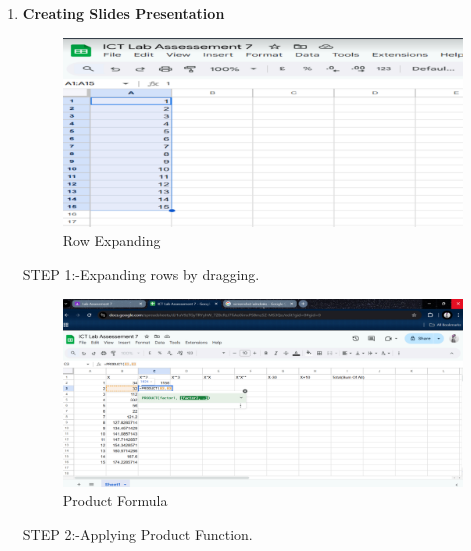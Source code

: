 \documentclass[a4paper,9pt]{article}
\begin{document}
\begin{enumerate}
	\item \textbf{Creating Slides Presentation}
	
	\begin{figure}[H]
		\centering
		\includegraphics[width=0.8\linewidth]{5.1.png}
		\caption{Row Expanding }
	\end{figure}
	STEP 1:-Expanding rows by dragging.
	\begin{figure}[H]
		\centering
		\includegraphics[width=0.8\linewidth]{5.2.png}
		\caption{Product Formula}
	\end{figure}
	STEP 2:-Applying Product Function.
	

\end{enumerate}
\end{document}
